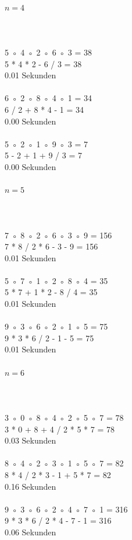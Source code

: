 \documentclass[a4paper,10pt,ngerman]{scrartcl}
\begin{document}
\paragraph{$n=4$} \hrulefill
\\
\\
5 ◦ 4 ◦ 2 ◦ 6 ◦ 3 = 38\\
5 * 4 * 2 - 6 / 3 = 38\\
0.01 Sekunden\\
\\
6 ◦ 2 ◦ 8 ◦ 4 ◦ 1 = 34\\
6 / 2 + 8 * 4 - 1 = 34\\
0.00 Sekunden\\
\\
5 ◦ 2 ◦ 1 ◦ 9 ◦ 3 = 7\\
5 - 2 + 1 + 9 / 3 = 7\\
0.00 Sekunden\\
\paragraph{$n=5$} \hrulefill
\\
\\
7 ◦ 8 ◦ 2 ◦ 6 ◦ 3 ◦ 9 = 156\\
7 * 8 / 2 * 6 - 3 - 9 = 156\\
0.01 Sekunden\\
\\
5 ◦ 7 ◦ 1 ◦ 2 ◦ 8 ◦ 4 = 35\\
5 * 7 + 1 * 2 - 8 / 4 = 35\\
0.01 Sekunden\\
\\
9 ◦ 3 ◦ 6 ◦ 2 ◦ 1 ◦ 5 = 75\\
9 * 3 * 6 / 2 - 1 - 5 = 75\\
0.01 Sekunden\\
\paragraph{$n=6$} \hrulefill
\\
\\
3 ◦ 0 ◦ 8 ◦ 4 ◦ 2 ◦ 5 ◦ 7 = 78\\
3 * 0 + 8 + 4 / 2 * 5 * 7 = 78\\
0.03 Sekunden\\
\\
8 ◦ 4 ◦ 2 ◦ 3 ◦ 1 ◦ 5 ◦ 7 = 82\\
8 * 4 / 2 * 3 - 1 + 5 * 7 = 82\\
0.16 Sekunden\\
\\
9 ◦ 3 ◦ 6 ◦ 2 ◦ 4 ◦ 7 ◦ 1 = 316\\
9 * 3 * 6 / 2 * 4 - 7 - 1 = 316\\
0.06 Sekunden\\
\end{document}
